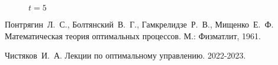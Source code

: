 \documentclass[a4paper,12pt]{article}
\begin{document}
\begin{figure}[H]
	\centering{\texttt{[image: P15]}}
	\caption{$t = 5$}
\end{figure}


\newpage
\begin{thebibliography}{99}
\item Понтрягин~Л.~С., Болтянский~В.~Г., Гамкрелидзе~Р.~В., Мищенко~Е.~Ф. Математическая теория оптимальных процессов. М.: Физматлит, 1961.
\item Чистяков~И.~А. Лекции по оптимальному управлению. 2022-2023.


\end{thebibliography}
\end{document}

